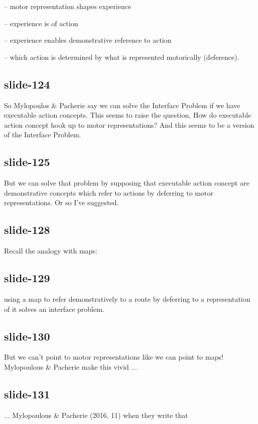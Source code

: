 \documentclass[12pt,\papersize]{extarticle}
\begin{document}
-- motor representation shapes experience



-- experience is of action



-- experience enables demonstrative reference to action



-- which action is determined by what is represented motorically (deference).


\subsection{slide-124}
So Mylopoulos \& Pacherie say we can solve the Interface Problem if we have
executable action concepts.  This seems to raise the question,
How do executable action concept hook up to motor representations?
And this seems to be a version of the Interface Problem.

\subsection{slide-125}
But we can solve that problem by supposing that executable action concept
are demonstrative concepts
which refer to actions by deferring to motor representations.
Or so I’ve suggested.

\subsection{slide-128}
Recall the analogy with maps:

\subsection{slide-129}
using a map to
refer demonstratively to a route by deferring to a representation of it
solves an interface problem.

\subsection{slide-130}
But we can’t point to motor representations like we can point to maps!
Mylopoulous \& Pacherie make this vivid ...

\subsection{slide-131}
... Mylopoulous \& Pacherie (2016, 11) when they write that
\end{document}

